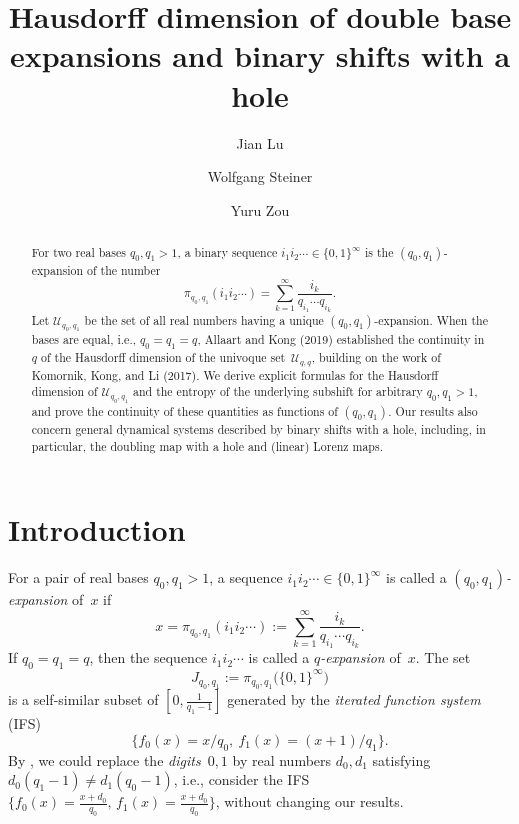 \documentclass{amsart}
\title[Hausdorff dimension of double base expansions]{Hausdorff dimension of double base expansions and binary shifts with a hole}
\author[J. Lu] {Jian Lu}
\author[W. Steiner]{Wolfgang Steiner}
\author[Y. Zou]{Yuru Zou}
\theoremstyle{definition}
\numberwithin{equation}{section}
\begin{document}
\begin{abstract}
For two real bases $q_0, q_1 > 1$, a binary sequence $i_1 i_2 \cdots \in \{0,1\}^\infty$ is the $(q_0,q_1)$-expansion of the number
\[
\pi_{q_0,q_1}(i_1 i_2 \cdots) = \sum_{k=1}^\infty \frac{i_k}{q_{i_1} \cdots q_{i_k}}.
\]
Let $\mathcal{U}_{q_0,q_1}$ be the set of all real numbers having a unique $(q_0,q_1)$-expansion. 
When the bases are equal, i.e., $q_0 = q_1 = q$, Allaart and Kong (2019) established the continuity in $q$ of the Hausdorff dimension of the univoque set~$\mathcal{U}_{q,q}$, building on the work of Komornik, Kong, and Li (2017). 
We derive explicit formulas for the Hausdorff dimension of $\mathcal{U}_{q_0,q_1}$ and the entropy of the underlying subshift for arbitrary $q_0, q_1 > 1$, and prove the continuity of these quantities as functions of $(q_0,q_1)$. 
Our results also concern general dynamical systems described by binary shifts with a hole, including, in particular, the doubling map with a hole and (linear) Lorenz maps.
\end{abstract}

\maketitle

\section{Introduction}
For a pair of real bases $q_0, q_1 > 1$, a sequence $i_1i_2\cdots \in \{0,1\}^\infty$ is called a \emph{$(q_0,q_1)$-expansion} of~$x$  if
\[
x = \pi_{q_0,q_1}(i_1i_2\cdots) := \sum_{k=1}^\infty \frac{i_k}{q_{i_1}\cdots q_{i_k}}.
\]
If $q_0=q_1=q$, then the sequence $i_1i_2\cdots$ is called a \emph{$q$-expansion} of~$x$. 
The set
\[
J_{q_0, q_1} := \pi_{q_0,q_1}\big(\{0,1\}^\infty\big)
\]
is a self-similar subset of $[0,\frac{1}{q_1-1}]$ generated by the \emph{iterated function system} (IFS)
\[
\{f_0(x) = x/q_0,\ f_1(x) = (x{+}1)/q_1\}.
\]
By \cite[Lemma~3.1]{KomSteZou2022}, we could replace the \emph{digits}~$0,1$ by real numbers $d_0, d_1$ satisfying $d_0(q_1{-}1) \ne d_1(q_0{-}1)$, i.e., consider the IFS $\{f_0(x) = \frac{x+d_0}{q_0},\, f_1(x) = \frac{x+d_0}{q_0}\}$, without changing our results.
\end{document}

